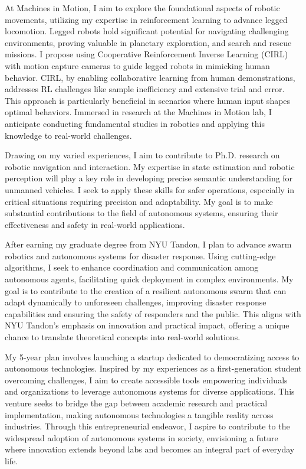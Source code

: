 \documentclass[12pt]{article}
\begin{document}
At Machines in Motion, I aim to explore the foundational aspects of robotic movements, utilizing my expertise in reinforcement learning to advance legged locomotion. Legged robots hold significant potential for navigating challenging environments, proving valuable in planetary exploration, and search and rescue missions. I propose using Cooperative Reinforcement Inverse Learning (CIRL) with motion capture cameras to guide legged robots in mimicking human behavior. CIRL, by enabling collaborative learning from human demonstrations, addresses RL challenges like sample inefficiency and extensive trial and error. This approach is particularly beneficial in scenarios where human input shapes optimal behaviors. Immersed in research at the Machines in Motion lab, I anticipate conducting fundamental studies in robotics and applying this knowledge to real-world challenges.







Drawing on my varied experiences, I aim to contribute to Ph.D. research on robotic navigation and interaction. My expertise in state estimation and robotic perception will play a key role in developing precise semantic understanding for unmanned vehicles. I seek to apply these skills for safer operations, especially in critical situations requiring precision and adaptability. My goal is to make substantial contributions to the field of autonomous systems, ensuring their effectiveness and safety in real-world applications.


After earning my graduate degree from NYU Tandon, I plan to advance swarm robotics and autonomous systems for disaster response. Using cutting-edge algorithms, I seek to enhance coordination and communication among autonomous agents, facilitating quick deployment in complex environments. My goal is to contribute to the creation of a resilient autonomous swarm that can adapt dynamically to unforeseen challenges, improving disaster response capabilities and ensuring the safety of responders and the public. This aligns with NYU Tandon's emphasis on innovation and practical impact, offering a unique chance to translate theoretical concepts into real-world solutions.

My 5-year plan involves launching a startup dedicated to democratizing access to autonomous technologies. Inspired by my experiences as a first-generation student overcoming challenges, I aim to create accessible tools empowering individuals and organizations to leverage autonomous systems for diverse applications. This venture seeks to bridge the gap between academic research and practical implementation, making autonomous technologies a tangible reality across industries. Through this entrepreneurial endeavor, I aspire to contribute to the widespread adoption of autonomous systems in society, envisioning a future where innovation extends beyond labs and becomes an integral part of everyday life.
\end{document}

